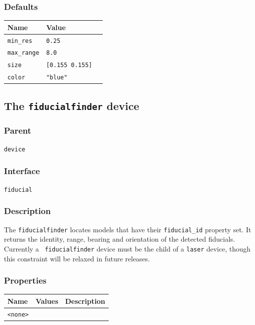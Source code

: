\documentclass[11pt,twoside]{report}
\begin{document}
\subsubsection*{Defaults}
\begin{tabularx}{\columnwidth}{llX}
\hline
Name & Value\\
\hline
\verb'min_res' & \verb'0.25'\\
\verb'max_range' & \verb'8.0' \\
\verb'size' & \verb'[0.155 0.155]'\\
\verb'color' & \verb'"blue"' \\
\hline
\end{tabularx}




\newpage
\subsection{The {\tt fiducialfinder} device}

\subsubsection*{Parent}
{\tt device}

\subsubsection*{Interface}
{\tt fiducial}

\subsubsection*{Description}

The \verb'fiducialfinder' locates models that have their
\verb'fiducial_id' property set. It returns the identity, range,
bearing and orientation of the detected fiducials.  Currently a {\tt
fiducialfinder} device must be the child of a {\tt laser} device,
though this constraint will be relaxed in future releases.

\subsubsection*{Properties}
\begin{tabularx}{\columnwidth}{llX}
\hline
Name & Values & Description \\
\hline
\verb'<none>'\\
\hline
\end{tabularx}
\end{document}
